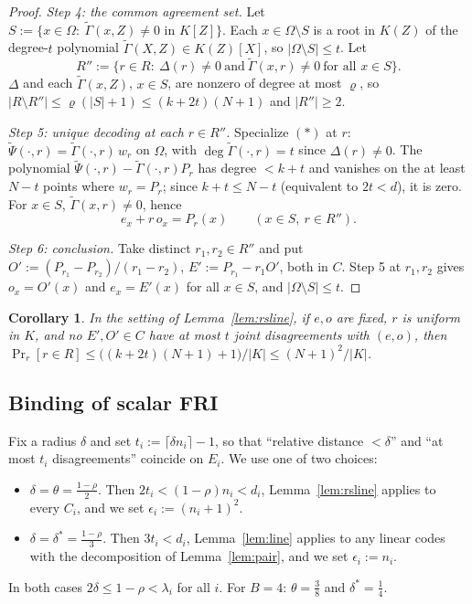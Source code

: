 \documentclass[11pt]{article}
\newtheorem{corollary}[theorem]{Corollary}
\theoremstyle{definition}
\newcommand{\K}{K}
\begin{document}
\begin{proof}
\emph{Step 4: the common agreement set.} Let $S:=\{x\in\Omega:\ \widetilde\Gamma(x,Z)\ne0\text{ in }\K[Z]\}$. Each $x\in\Omega\setminus S$ is a root in $\K(Z)$ of the degree-$t$ polynomial $\widetilde\Gamma(X,Z)\in\K(Z)[X]$, so $|\Omega\setminus S|\le t$. Let
\[
R'':=\{r\in R:\ \Delta(r)\ne0\ \text{and}\ \widetilde\Gamma(x,r)\ne0\ \text{for all }x\in S\}.
\]
$\Delta$ and each $\widetilde\Gamma(x,Z)$, $x\in S$, are nonzero of degree at most $\varrho$, so $|R\setminus R''|\le\varrho(|S|+1)\le(k+2t)(N+1)$ and $|R''|\ge2$.

\emph{Step 5: unique decoding at each $r\in R''$.} Specialize $(\ast)$ at $r$: $\widetilde\Psi(\cdot,r)=\widetilde\Gamma(\cdot,r)\,w_r$ on $\Omega$, with $\deg\widetilde\Gamma(\cdot,r)=t$ since $\Delta(r)\ne0$. The polynomial $\widetilde\Psi(\cdot,r)-\widetilde\Gamma(\cdot,r)P_r$ has degree $<k+t$ and vanishes on the at least $N-t$ points where $w_r=P_r$; since $k+t\le N-t$ (equivalent to $2t<d$), it is zero. For $x\in S$, $\widetilde\Gamma(x,r)\ne0$, hence
\[
e_x+r\,o_x=P_r(x)\qquad(x\in S,\ r\in R'').
\]

\emph{Step 6: conclusion.} Take distinct $r_1,r_2\in R''$ and put $O':=(P_{r_1}-P_{r_2})/(r_1-r_2)$, $E':=P_{r_1}-r_1O'$, both in $C$. Step 5 at $r_1,r_2$ gives $o_x=O'(x)$ and $e_x=E'(x)$ for all $x\in S$, and $|\Omega\setminus S|\le t$.
\end{proof}

\begin{corollary}\label{cor:rsline}
In the setting of Lemma~\ref{lem:rsline}, if $e,o$ are fixed, $r$ is uniform in $\K$, and no $E',O'\in C$ have at most $t$ joint disagreements with $(e,o)$, then $\Pr_r[r\in R]\le\big((k+2t)(N+1)+1\big)/|\K|\le(N+1)^2/|\K|$.
\end{corollary}


\subsection{Binding of scalar FRI}

Fix a radius $\delta$ and set $t_i:=\lceil\delta n_i\rceil-1$, so that ``relative distance $<\delta$'' and ``at most $t_i$ disagreements'' coincide on $E_i$. We use one of two choices:
\begin{itemize}[leftmargin=*]
\item[(RS)] $\delta=\theta=\frac{1-\rho}2$. Then $2t_i<(1-\rho)n_i<d_i$, Lemma~\ref{lem:rsline} applies to every $C_i$, and we set $\epsilon_i:=(n_i+1)^2$.
\item[(Lin)] $\delta=\delta^\ast=\frac{1-\rho}3$. Then $3t_i<d_i$, Lemma~\ref{lem:line} applies to any linear codes with the decomposition of Lemma~\ref{lem:pair}, and we set $\epsilon_i:=n_i$.
\end{itemize}
In both cases $2\delta\le1-\rho<\lambda_i$ for all $i$. For $B=4$: $\theta=\frac38$ and $\delta^\ast=\frac14$.
\end{document}
